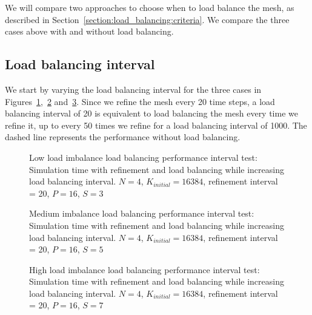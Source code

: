We will compare two approaches to choose when to load balance the mesh, as described in
Section~\ref{section:load_balancing:criteria}. We compare the three cases above with and without
load balancing.

\subsection{Load balancing interval}\label{subsection:results:load_balancing_performance:interval}

We start by varying the load balancing interval for the three cases in
Figures~\ref{fig:load_balancing_efficiency_interval},~\ref{fig:load_balancing_efficiency_interval_s5}
and~\ref{fig:load_balancing_efficiency_interval_s7}. Since we refine the mesh every 20 time steps, a
load balancing interval of 20 is equivalent to load balancing the mesh every time we refine it, up
to every 50 times we refine for a load balancing interval of 1000. The dashed line represents the
performance without load balancing.

\begin{figure}[H]
	\centering
	
	\caption{Low load imbalance load balancing performance interval test: Simulation time with refinement and load balancing while increasing load balancing interval. \(N = 4\), \(K_{initial} = 16384\), refinement interval = 20, \(P = 16\), \(S = 3\)}\label{fig:load_balancing_efficiency_interval}
\end{figure}

\begin{figure}[H]
	\centering
	
	\caption{Medium imbalance load balancing performance interval test: Simulation time with refinement and load balancing while increasing load balancing interval. \(N = 4\), \(K_{initial} = 16384\), refinement interval = 20, \(P = 16\), \(S = 5\)}\label{fig:load_balancing_efficiency_interval_s5}
\end{figure}

\begin{figure}[H]
	\centering
	
	\caption{High load imbalance load balancing performance interval test: Simulation time with refinement and load balancing while increasing load balancing interval. \(N = 4\), \(K_{initial} = 16384\), refinement interval = 20, \(P = 16\), \(S = 7\)}\label{fig:load_balancing_efficiency_interval_s7}
\end{figure}

